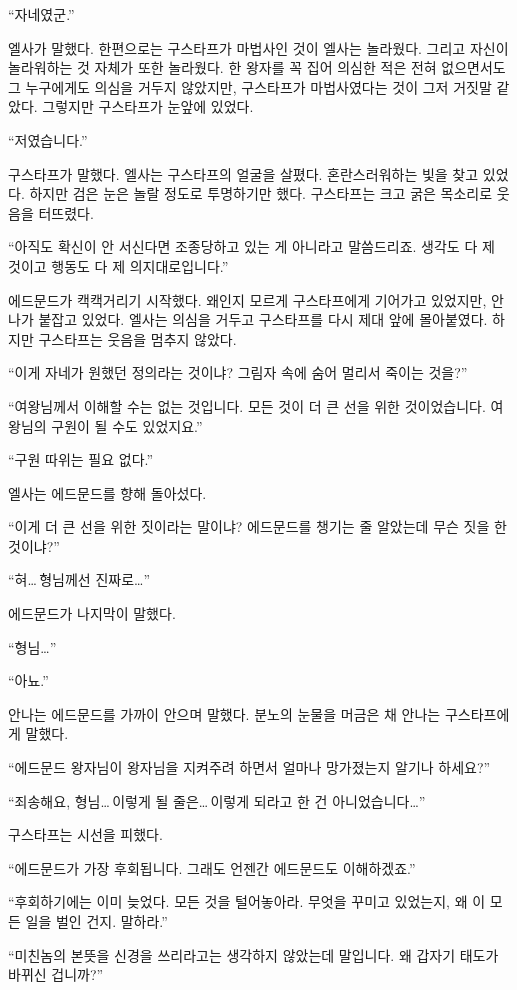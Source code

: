 ``자네였군.''

엘사가 말했다. 한편으로는 구스타프가 마법사인 것이 엘사는 놀라웠다. 그리고 자신이 놀라워하는 것 자체가 또한 놀라웠다. 한 왕자를 꼭 집어 의심한 적은 전혀 없으면서도 그 누구에게도 의심을 거두지 않았지만, 구스타프가 마법사였다는 것이 그저 거짓말 같았다. 그렇지만 구스타프가 눈앞에 있었다.

``저였습니다.''

구스타프가 말했다. 엘사는 구스타프의 얼굴을 살폈다. 혼란스러워하는 빛을 찾고 있었다. 하지만 검은 눈은 놀랄 정도로 투명하기만 했다. 구스타프는 크고 굵은 목소리로 웃음을 터뜨렸다.

``아직도 확신이 안 서신다면 조종당하고 있는 게 아니라고 말씀드리죠. 생각도 다 제 것이고 행동도 다 제 의지대로입니다.''

에드문드가 캑캑거리기 시작했다. 왜인지 모르게 구스타프에게 기어가고 있었지만, 안나가 붙잡고 있었다. 엘사는 의심을 거두고 구스타프를 다시 제대 앞에 몰아붙였다. 하지만 구스타프는 웃음을 멈추지 않았다.

``이게 자네가 원했던 정의라는 것이냐? 그림자 속에 숨어 멀리서 죽이는 것을?''

``여왕님께서 이해할 수는 없는 것입니다. 모든 것이 더 큰 선을 위한 것이었습니다. 여왕님의 구원이 될 수도 있었지요.''

``구원 따위는 필요 없다.''

엘사는 에드문드를 향해 돌아섰다.

``이게 더 큰 선을 위한 짓이라는 말이냐? 에드문드를 챙기는 줄 알았는데 무슨 짓을 한 것이냐?''

``혀\ldots\,형님께선 진짜로\ldots''

에드문드가 나지막이 말했다.

``형님\ldots''

``아뇨.''

안나는 에드문드를 가까이 안으며 말했다. 분노의 눈물을 머금은 채 안나는 구스타프에게 말했다.

``에드문드 왕자님이 왕자님을 지켜주려 하면서 얼마나 망가졌는지 알기나 하세요?''

``죄송해요, 형님\ldots\,이렇게 될 줄은\ldots\,이렇게 되라고 한 건 아니었습니다\ldots''

구스타프는 시선을 피했다.

``에드문드가 가장 후회됩니다. 그래도 언젠간 에드문드도 이해하겠죠.''

``후회하기에는 이미 늦었다. 모든 것을 털어놓아라. 무엇을 꾸미고 있었는지, 왜 이 모든 일을 벌인 건지. 말하라.''

``미친놈의 본뜻을 신경을 쓰리라고는 생각하지 않았는데 말입니다. 왜 갑자기 태도가 바뀌신 겁니까?''

